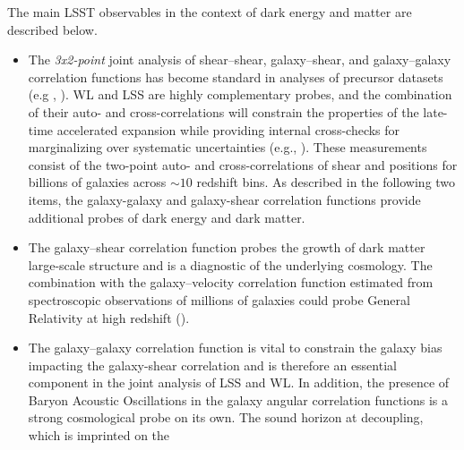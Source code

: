 The main LSST observables in the context of dark energy and matter are described below.

\begin{itemize}
\item The {\sl 3x2-point} joint analysis of shear--shear, galaxy--shear, and galaxy--galaxy
correlation functions has become standard in analyses of precursor datasets (e.g \cite{DESC2017},
\cite{Joudaki2017}). WL and LSS are highly complementary probes, and the combination
of their auto- and cross-correlations will constrain the properties of the late-time accelerated expansion while providing
internal cross-checks for marginalizing over systematic uncertainties (e.g., \cite{Mandelbaum2017}).
These measurements consist of the two-point auto- and cross-correlations of shear and positions for billions of galaxies across $\sim 10$ redshift bins.
As described in the following two items, the galaxy-galaxy and galaxy-shear correlation functions provide additional probes of dark energy and dark matter.
%
%
\item The galaxy--shear correlation function probes the growth of dark matter large-scale structure and is a
diagnostic of the underlying cosmology. The combination with the
galaxy--velocity correlation function estimated from spectroscopic observations of millions of galaxies
could probe General Relativity at high redshift (\cite{Reyes2007}).
%
\item The galaxy--galaxy correlation function is vital to constrain the galaxy bias impacting the galaxy-shear correlation and is therefore
an essential component in the joint analysis of LSS and WL. In addition, the presence of
Baryon Acoustic Oscillations in the galaxy angular correlation functions is a strong cosmological
probe on its own. The sound horizon at decoupling, which is imprinted on the

\end{itemize}
